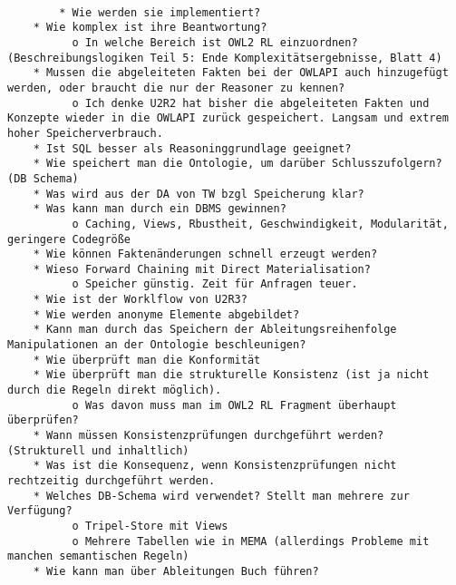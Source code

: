 \begin{verbatim}
    
        * Wie werden sie implementiert?
    * Wie komplex ist ihre Beantwortung?
          o In welche Bereich ist OWL2 RL einzuordnen? (Beschreibungslogiken Teil 5: Ende Komplexitätsergebnisse, Blatt 4) 
    * Mussen die abgeleiteten Fakten bei der OWLAPI auch hinzugefügt werden, oder braucht die nur der Reasoner zu kennen?
          o Ich denke U2R2 hat bisher die abgeleiteten Fakten und Konzepte wieder in die OWLAPI zurück gespeichert. Langsam und extrem hoher Speicherverbrauch. 
    * Ist SQL besser als Reasoninggrundlage geeignet?
    * Wie speichert man die Ontologie, um darüber Schlusszufolgern? (DB Schema)
    * Was wird aus der DA von TW bzgl Speicherung klar?
    * Was kann man durch ein DBMS gewinnen?
          o Caching, Views, Rbustheit, Geschwindigkeit, Modularität, geringere Codegröße 
    * Wie können Faktenänderungen schnell erzeugt werden?
    * Wieso Forward Chaining mit Direct Materialisation?
          o Speicher günstig. Zeit für Anfragen teuer. 
    * Wie ist der Worklflow von U2R3?
    * Wie werden anonyme Elemente abgebildet?
    * Kann man durch das Speichern der Ableitungsreihenfolge Manipulationen an der Ontologie beschleunigen?
    * Wie überprüft man die Konformität
    * Wie überprüft man die strukturelle Konsistenz (ist ja nicht durch die Regeln direkt möglich).
          o Was davon muss man im OWL2 RL Fragment überhaupt überprüfen? 
    * Wann müssen Konsistenzprüfungen durchgeführt werden? (Strukturell und inhaltlich)
    * Was ist die Konsequenz, wenn Konsistenzprüfungen nicht rechtzeitig durchgeführt werden.
    * Welches DB-Schema wird verwendet? Stellt man mehrere zur Verfügung?
          o Tripel-Store mit Views
          o Mehrere Tabellen wie in MEMA (allerdings Probleme mit manchen semantischen Regeln) 
    * Wie kann man über Ableitungen Buch führen? 
\end{verbatim}

